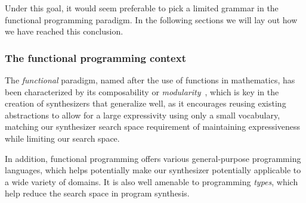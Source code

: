\documentclass{article}
\begin{document}
Under this goal, it would seem preferable to pick a limited grammar in the functional programming paradigm.
In the following sections we will lay out how we have reached this conclusion.

\subsubsection{The functional programming context}


The \emph{functional} paradigm, named after the use of functions in mathematics,
has been characterized by its composability or \emph{modularity}~\citep{hughes1989functional},
which is key in the creation of synthesizers that generalize well,
as it encourages reusing existing abstractions to allow for a large expressivity using only a small vocabulary,
matching our synthesizer search space requirement of maintaining expressiveness while limiting our search space.

In addition, functional programming offers various general-purpose programming languages,
which helps potentially make our synthesizer potentially applicable to a wide variety of domains.
It is also well amenable to programming \emph{types},
which help reduce the search space in program synthesis.
\end{document}
